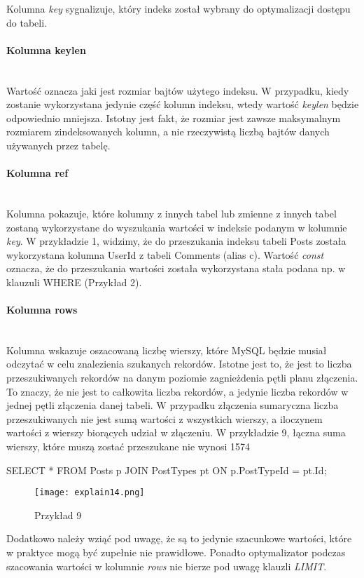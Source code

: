 Kolumna \textit{key} sygnalizuje, który indeks został wybrany do optymalizacji dostępu do tabeli.

\paragraph{Kolumna key\textunderscore len}\leavevmode\\
Wartość oznacza jaki jest rozmiar bajtów użytego indeksu. W przypadku, kiedy zostanie wykorzystana jedynie część kolumn indeksu, wtedy wartość \textit{key\textunderscore len} będzie odpowiednio mniejsza. Istotny jest fakt, że rozmiar jest zawsze maksymalnym rozmiarem zindeksowanych kolumn, a nie rzeczywistą liczbą bajtów danych używanych przez tabelę.

\paragraph{Kolumna ref}\leavevmode\\
Kolumna pokazuje, które kolumny z innych tabel lub zmienne z innych tabel zostaną wykorzystane do wyszukania wartości w indeksie podanym w kolumnie \textit{key}. W przykładzie 1, widzimy, że do przeszukania indeksu tabeli Posts została wykorzystana kolumna UserId z tabeli Comments (alias c). Wartość \textit{const} oznacza, że do przeszukania wartości została wykorzystana stała podana np. w klauzuli WHERE (Przykład 2).

\paragraph{Kolumna rows}\leavevmode\\
Kolumna wskazuje oszacowaną liczbę wierszy, które MySQL będzie musiał odczytać w celu znalezienia szukanych rekordów. Istotne jest to, że jest to liczba przeszukiwanych rekordów na danym poziomie zagnieżdenia pętli planu złączenia. To znaczy, że nie jest to całkowita liczba rekordów, a jedynie liczba rekordów w jednej pętli złączenia danej tabeli. W przypadku złączenia sumaryczna liczba przeszukiwanych nie jest sumą wartości z wszystkich wierszy, a iloczynem wartości z wierszy biorących udział w złączeniu. W przykładzie 9, łączna suma wierszy, które muszą zostać przeszukane nie wynosi 1574
\begin{spverbatim}
	SELECT * FROM Posts p JOIN PostTypes pt ON p.PostTypeId = pt.Id;
\end{spverbatim}
\begin{figure}[H]
	\texttt{[image: explain14.png]} 
	\caption{Przykład 9}
\end{figure}
Dodatkowo należy wziąć pod uwagę, że są to jedynie szacunkowe wartości, które w praktyce mogą być zupełnie nie prawidłowe. Ponadto optymalizator podczas szacowania wartości w kolumnie \textit{rows} nie bierze pod uwagę klauzli \textit{LIMIT}.

